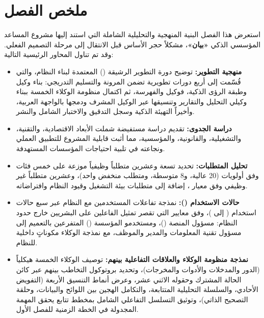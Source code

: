 \section{ملخص الفصل}
\label{sec:analysis-summary}

{\large
استعرض هذا الفصل البنية المنهجية والتحليلية الشاملة التي استند إليها مشروع المساعد المؤسسي الذكي \textbf{«بيان»}، مشكلاً حجر الأساس قبل الانتقال إلى مرحلة التصميم الفعلي. وقد تم تناول المحاور الرئيسية التالية:

\begin{itemize}
    \item \textbf{منهجية التطوير:} توضيح دورة التطوير الرشيقة () المعتمدة لبناء النظام، والتي قُسّمت إلى أربع دورات تطويرية تضمن المرونة والتسليم التدريجي: بناء وكيل  وطبقة الرؤى الذكية، فوكيل  والفهرسة، ثم اكتمال منظومة الوكلاء الخمسة ببناء وكيلي التحليل والتقارير وتنسيقها عبر الوكيل المشرف ودمجها بالواجهة العربية، وأخيراً التهيئة الذكية وسجل التدقيق والاختبار الشامل والنشر.

    \item \textbf{دراسة الجدوى:} تقديم دراسة مستفيضة شملت الأبعاد الاقتصادية، والتقنية، والتشغيلية، والقانونية، والمؤسسية، مما أثبت قابلية المشروع للتطبيق العملي ونجاعته في تلبية احتياجات المؤسسات المستهدفة.

    \item \textbf{تحليل المتطلبات:} تحديد تسعة وعشرين متطلباً وظيفياً موزعة على خمس فئات وفق أولويات  (20 عالية، و8 متوسطة، ومتطلب منخفض واحد)، وعشرين متطلباً غير وظيفي وفق معيار ، إضافة إلى متطلبات بيئة التشغيل وقيود النظام وافتراضاته.

    \item \textbf{حالات الاستخدام ():} نمذجة تفاعلات المستخدمين مع النظام عبر سبع حالات استخدام ( إلى )، وفق معايير  التي تقصر تمثيل الفاعلين على البشريين خارج حدود النظام: مسؤول المنصة ()، ومستخدمو المؤسسة () المتفرعين بالتعميم إلى مسؤول تقنية المعلومات والمدير والموظف، مع نمذجة الوكلاء مكوناتٍ داخلية للنظام.

    \item \textbf{نمذجة منظومة الوكلاء والعلاقات التفاعلية بينهم:} توصيف الوكلاء الخمسة هيكلياً (الدور والمدخلات والأدوات والمخرجات)، وتحديد بروتوكول التخاطب بينهم عبر كائن الحالة المشترك  وحقوله الاثني عشر، وعرض أنماط التنسيق الأربعة (التفويض الأحادي، والسلسلة التحليلية المتتابعة، والتكامل الهجين بين اللوائح والبيانات، وحلقة التصحيح الذاتي)، وتوثيق التسلسل التفاعلي الشامل بمخطط تتابع  يحقق المهمة المجدولة في الخطة الزمنية للفصل الأول.


\end{itemize}}
